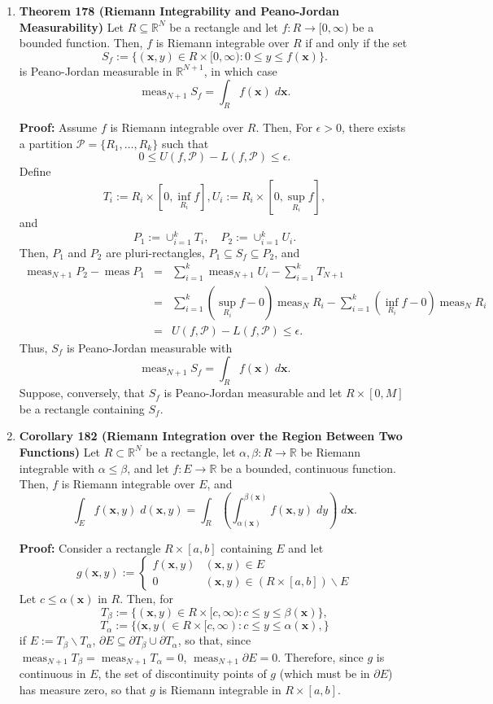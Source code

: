 \documentclass[11pt]{article}
\newcommand{\meas}{\operatorname{meas}}
\newcommand{\bx}{\mathbf{x}}
\newcommand{\pjm}{Peano-Jordan measurable }
\newcommand{\Rint}{Riemann integrable }
\begin{document}
\begin{enumerate}
\item \textbf{Theorem 178 (Riemann Integrability and Peano-Jordan
                                                               Measurability)}
Let $R \subseteq \mathbb{R}^N$ be a rectangle and let
$f: R \rightarrow [0,\infty)$ be a bounded function. Then, $f$ is \Rint
over $R$ if and only if the set
\[S_f := \{(\bx,y) \in R \times [0,\infty) : 0 \leq y \leq f(\bx)\}.\]
is \pjm in $\mathbb{R}^{N + 1}$, in which case
\[\meas_{N + 1} S_f = \int_R f(\bx) \; d\bx.\]

{\bf Proof:} Assume $f$ is \Rint over $R$. Then, For $\epsilon > 0$, there
exists a partition $\mathcal{P} = \{R_1,\ldots,R_k\}$ such that
\[0 \leq U(f,\mathcal{P}) - L(f,\mathcal{P}) \leq \epsilon.\]
Define
\[T_i := R_i \times \left[0,\inf_{R_i} f\right],
U_i := R_i \times \left[0,\sup_{R_i} f\right],\]
and
\[P_1 := \cup_{i = 1}^k T_i, \quad P_2 := \cup_{i = 1}^k U_i.\]
Then, $P_1$ and $P_2$ are pluri-rectangles, $P_1 \subseteq S_f \subseteq P_2$,
and
\begin{eqnarray*}
\meas_{N + 1} P_2 - \meas P_1
 & = & \sum_{i = 1}^k \meas_{N + 1} U_i - \sum_{i = 1}^k T_{N + 1} \\
 & = & \sum_{i = 1}^k\left(\sup_{R_i} f - 0\right)\meas_NR_i
   -   \sum_{i = 1}^k\left(\inf_{R_i} f - 0\right)\meas_NR_i \\
 & = & U(f,\mathcal{P}) - L(f,\mathcal{P}) \leq \epsilon.
\end{eqnarray*}
Thus, $S_f$ is \pjm with
\[\meas_{N + 1} S_f = \int_R f(\bx) \; d\bx.\]
Suppose, conversely, that $S_f$ is \pjm and let $R \times [0,M]$ be a
rectangle containing $S_f$.

\item \textbf{Corollary 182 (Riemann Integration over the Region Between Two
                                                                   Functions)}
Let $R \subset \mathbb{R}^N$ be a rectangle, let
$\alpha,\beta: R \rightarrow \mathbb{R}$ be \Rint with
$\alpha \leq \beta$, and let $f: E \rightarrow \mathbb{R}$ be a bounded,
continuous function. Then, $f$ is \Rint over $E$, and
\[\int_E f(\bx,y) \; d(\bx,y)
 = \int_R \left(\int_{\alpha(\bx)}^{\beta(\bx)} f(\bx,y) \; dy\right) \; d\bx
.\]

{\bf Proof:} Consider a rectangle $R \times [a,b]$ containing $E$ and let
\[g(\bx,y) :=
    \left\{
        \begin{array}{cc}
            f(\bx,y) & (\bx,y) \in E \\
            0        & (\bx,y) \in (R \times [a,b]) \backslash E
        \end{array}
    \right
.\]
Let $c \leq \alpha(\bx)$ in $R$. Then, for
\[T_{\beta}
 := \{(\bx,y) \in R \times [c,\infty) : c \leq y \leq \beta(\bx)\},\]
\[T_{\alpha}
 := \{(\bx,y( \in R \times [c,\infty) : c \leq y \leq \alpha(\bx),\}\]
if $E := T_{\beta} \backslash T_{\alpha}$,
$\partial E \subseteq \partial T_{\beta} \cup \partial T_{\alpha}$, so that,
since $\meas_{N + 1} T_{\beta} = \meas_{N + 1} T_{\alpha} = 0$,
$\meas_{N + 1} \partial E = 0$. Therefore, since $g$ is continuous in $E$, the
set of discontinuity points of $g$ (which must be in $\partial E$) has measure
zero, so that $g$ is \Rint in $R \times [a,b]$.


\end{enumerate}
\end{document}
